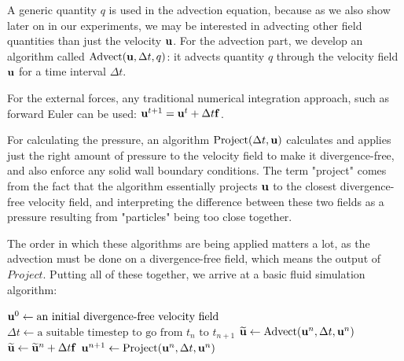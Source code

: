 A generic quantity $q$ is used in the advection equation, because as we also
show later on in our experiments, we may be interested in advecting other field
quantities than just the velocity $\vb{u}$. For the advection part, we develop
an algorithm called $\text{Advect}(\vb{u}, \Delta t, q)$: it advects quantity
$q$ through the velocity field $\vb{u}$ for a time interval $\Delta t$. 

For the external forces, any traditional numerical integration approach, such as
forward Euler can be used: $\vb{u}^{t+1} = \vb{u}^t + \Delta t \vb{f}$.

For calculating the pressure, an algorithm $\text{Project}(\Delta t, \vb{u})$
calculates and applies just the right amount of pressure to the velocity field
to make it divergence-free, and also enforce any solid wall boundary
conditions. The term "project" comes from the fact that the algorithm
essentially projects $\vb{u}$ to the closest divergence-free velocity field, and
interpreting the difference between these two fields as a pressure resulting
from "particles" being too close together. 

The order in which these algorithms are being applied matters a lot, as the
advection must be done on a divergence-free field, which means the output of
$Project$. Putting all of these together, we arrive at a basic fluid simulation
algorithm:

\begin{algorithmic}
    \State $\vb{u}^0 \gets \text{an initial divergence-free velocity field}$
        \State $\Delta t 
            \gets \text{a suitable timestep to go from $t_n$ to $t_{n+1}$}$
        \State $\widetilde{\vb{u}} 
            \gets \text{Advect}(\vb{u}^n,\Delta t, \vb{u}^n)$
        \State $\widetilde{\vb{u}} 
            \gets \widetilde{\vb{u}}^n + \Delta t \vb{f}$
        \State $\vb{u}^{n+1}
            \gets \text{Project}(\vb{u}^n,\Delta t, \vb{u}^n)$
            \EndFor {}
\end{algorithmic}




